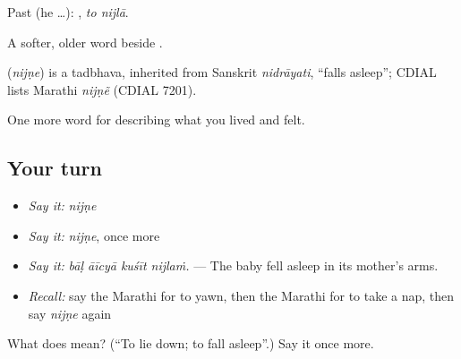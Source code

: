 Past (he …):  , \emph{to nijlā}.

A softer, older word beside .

\begin{cousinweb}
\textbf{} (\emph{nijṇe}) is a tadbhava, inherited from Sanskrit \emph{nidrāyati}, \textquotedblleft{}falls asleep\textquotedblright{}; CDIAL lists Marathi \emph{nijṇẽ} (CDIAL 7201).
\end{cousinweb}

\begin{grammarlens}[title={What you've built}]
One more word for describing what you lived and felt.
\end{grammarlens}

\subsection*{Your turn}
\begin{itemize}
\raggedright
  \item \emph{Say it:} \emph{nijṇe}
  \item \emph{Say it:} \emph{nijṇe}, once more
  \item \emph{Say it:} \emph{bāḷ āīcyā kuśīt nijlaṁ.} — The baby fell asleep in its mother's arms.
  \item \emph{Recall:} say the Marathi for to yawn, then the Marathi for to take a nap, then say \emph{nijṇe} again
\end{itemize}

\begin{tcolorbox}[breakable,colback=teal!4,colframe=teal!35!black,title={Before you move on}]
What does  mean? (\textquotedblleft{}To lie down; to fall asleep\textquotedblright{}.) Say it once more.
\end{tcolorbox}
